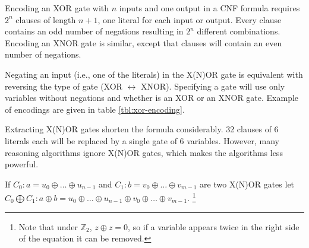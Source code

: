 \begin{table}
  \centering

  \caption{XOR/XNOR gates}
  \label{tbl:xor-formula}
\end{table}

Encoding an XOR gate with $n$ inputs and one output in a CNF
formula requires $2^n$ clauses of length $n + 1$, one literal
for each input or output.  Every clause contains an odd number of
negations resulting in $2^n$ different combinations. Encoding an
XNOR gate is similar, except that clauses will contain an even
number of negations.

Negating an input (i.e., one of the literals) in the X(N)OR gate is
equivalent with reversing the type of gate (XOR $\leftrightarrow$
XNOR). Specifying a gate will use only variables without negations
and whether is an XOR or an XNOR gate.  Example of encodings are
given in table \ref{tbl:xor-encoding}.

Extracting X(N)OR gates shorten the formula considerably. 32
clauses of 6 literals each will be replaced by a single gate of 6
variables. However, many reasoning algorithms ignore X(N)OR gates,
which makes the algorithms less powerful.

\begin{table}
  \centering

  \caption{Example of CNF encodings of XOR and XNOR gates}
  \label{tbl:xor-encoding}
\end{table}


\begin{mydef}
  If $C_0: a = u_0 \oplus \ldots \oplus u_{n-1}$ and $C_1: b =
  v_0 \oplus \ldots \oplus v_{m-1}$ are two X(N)OR gates let $C_0
  \bigoplus C_1: a \oplus b = u_0 \oplus \ldots \oplus u_{n-1}
  \oplus v_0 \oplus \ldots \oplus v_{m-1}$. \footnote{Note that
  under $\mathbb{Z}_2$, $z \oplus z = 0$, so if a variable appears
  twice in the right side of the equation it can be removed.}
\end{mydef}

